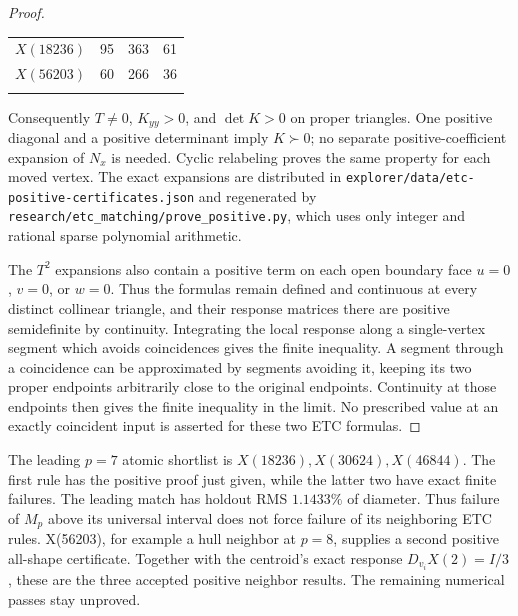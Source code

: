 \documentclass[11pt]{article}
\theoremstyle{definition}
\newcommand{\pathcode}[1]{\nolinkurl{#1}}
\newcommand{\bottomrule}{\noalign{\vskip3pt\hrule height 0.8pt}}
\begin{document}
\begin{proof}
\begin{center}
\begin{tabular}{lrrr}
$X(18236)$ & 95 & 363 & 61\\
$X(56203)$ & 60 & 266 & 36\\\bottomrule
\end{tabular}
\end{center}
Consequently $T\ne0$, $K_{yy}>0$, and $\det K>0$ on proper
triangles. One positive diagonal and a positive determinant imply
$K\succ0$; no separate positive-coefficient expansion of $N_x$ is
needed. Cyclic relabeling proves the same property for each moved vertex.
The exact expansions are distributed in
\pathcode{explorer/data/etc-positive-certificates.json} and regenerated
by \pathcode{research/etc_matching/prove_positive.py}, which uses only
integer and rational sparse polynomial arithmetic.

The $T^2$ expansions also contain a positive term on each open boundary
face $u=0$, $v=0$, or $w=0$. Thus the formulas remain defined and
continuous at every distinct collinear triangle, and their response
matrices there are positive semidefinite by continuity. Integrating the
local response along a single-vertex segment which avoids coincidences
gives the finite inequality. A segment through a coincidence can be
approximated by segments avoiding it, keeping its two proper endpoints
arbitrarily close to the original endpoints. Continuity at those
endpoints then gives the finite inequality in the limit. No prescribed
value at an exactly coincident input is asserted for these two ETC
formulas.
\end{proof}

The leading $p=7$ atomic shortlist is
$X(18236),X(30624),X(46844)$. The first rule has the positive proof just
given, while the latter two have exact finite failures. The leading
match has holdout RMS $1.1433\%$ of diameter. Thus failure of $M_p$
above its universal interval does not force failure of its neighboring
ETC rules. X(56203), for example a hull neighbor at $p=8$, supplies a
second positive all-shape certificate. Together with the centroid's
exact response $D_{v_i}X(2)=I/3$, these are the three accepted positive
neighbor results. The remaining numerical passes stay unproved.
\end{document}
